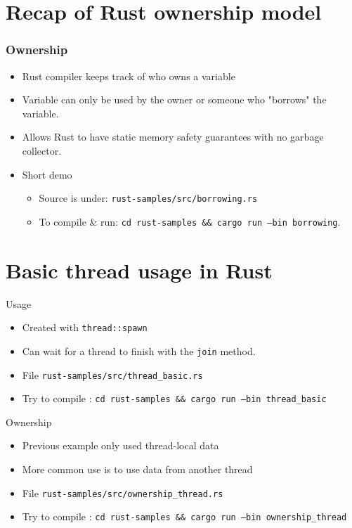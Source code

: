 \documentclass{beamer}
\begin{document}
\section{Recap of Rust ownership model}
\begin{frame}
    \frametitle{Ownership}
    \begin{itemize}
        \item Rust compiler keeps track of who owns a variable
        \item Variable can only be used by the owner or someone who "borrows" the variable.
        \item Allows Rust to have static memory safety guarantees with no garbage collector.
        \item Short demo
        \begin{itemize}
            \item Source is under: \texttt{rust-samples/src/borrowing.rs}
            \item To compile \& run: \texttt{cd rust-samples \&\& cargo run --bin borrowing}.
        \end{itemize}
    \end{itemize}
\end{frame}

\section{Basic thread usage in Rust}

\begin{frame}{Usage}
    \begin{itemize}
        \item Created with \texttt{thread::spawn}
        \item Can wait for a thread to finish with the \texttt{join} method.
        \item File \texttt{rust-samples/src/thread\_basic.rs}
        \item Try to compile : \texttt{cd rust-samples \&\& cargo run --bin thread\_basic}
    \end{itemize}
\end{frame}

\begin{frame}{Ownership}
    \begin{itemize}
        \item Previous example only used thread-local data
        \item More common use is to use data from another thread
        \item File \texttt{rust-samples/src/ownership\_thread.rs}
        \item Try to compile : \texttt{cd rust-samples \&\& cargo run --bin ownership\_thread}
    \end{itemize}
\end{frame}
\end{document}
